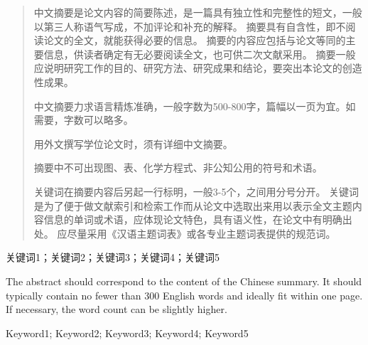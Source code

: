 \begin{abstract}
    中文摘要是论文内容的简要陈述，是一篇具有独立性和完整性的短文，一般以第三人称语气写成，不加评论和补充的解释。
    摘要具有自含性，即不阅读论文的全文，就能获得必要的信息。
    摘要的内容应包括与论文等同的主要信息，供读者确定有无必要阅读全文，也可供二次文献采用。
    摘要一般应说明研究工作的目的、研究方法、研究成果和结论，要突出本论文的创造性成果。

    中文摘要力求语言精炼准确，一般字数为500-800字，篇幅以一页为宜。如需要，字数可以略多。

    用外文撰写学位论文时，须有详细中文摘要。

    摘要中不可出现图、表、化学方程式、非公知公用的符号和术语。

    关键词在摘要内容后另起一行标明，一般3-5个，之间用分号分开。
    关键词是为了便于做文献索引和检索工作而从论文中选取出来用以表示全文主题内容信息的单词或术语，应体现论文特色，具有语义性，在论文中有明确出处。
    应尽量采用《汉语主题词表》或各专业主题词表提供的规范词。
\end{abstract}

\begin{keywords}
    关键词1；关键词2；关键词3；关键词4；关键词5
\end{keywords}

\begin{enabstract}
    The abstract should correspond to the content of the Chinese summary.
    It should typically contain no fewer than 300 English words and ideally fit within one page.
    If necessary, the word count can be slightly higher.
\end{enabstract}

\begin{enkeywords}
    Keyword1; Keyword2; Keyword3; Keyword4; Keyword5
\end{enkeywords}

